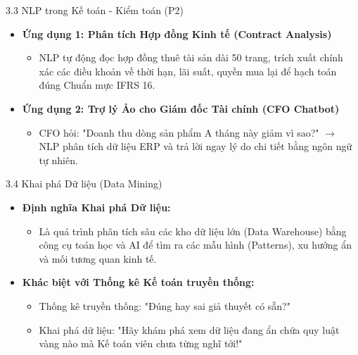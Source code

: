 \documentclass[aspectratio=169]{beamer}
\begin{document}
\begin{frame}{3.3 NLP trong Kế toán - Kiểm toán (P2)}
    \begin{itemize}
        \item \textbf{Ứng dụng 1: Phân tích Hợp đồng Kinh tế (Contract Analysis)}
        \begin{itemize}
            \item NLP tự động đọc hợp đồng thuê tài sản dài 50 trang, trích xuất chính xác các điều khoản về thời hạn, lãi suất, quyền mua lại để hạch toán đúng Chuẩn mực IFRS 16.
        \end{itemize}
        \item \textbf{Ứng dụng 2: Trợ lý Ảo cho Giám đốc Tài chính (CFO Chatbot)}
        \begin{itemize}
            \item CFO hỏi: "Doanh thu dòng sản phẩm A tháng này giảm vì sao?" $\rightarrow$ NLP phân tích dữ liệu ERP và trả lời ngay lý do chi tiết bằng ngôn ngữ tự nhiên.
        \end{itemize}
    \end{itemize}
\end{frame}

\begin{frame}{3.4 Khai phá Dữ liệu (Data Mining)}
    \begin{itemize}
        \item \textbf{Định nghĩa Khai phá Dữ liệu:}
        \begin{itemize}
            \item Là quá trình phân tích sâu các kho dữ liệu lớn (Data Warehouse) bằng công cụ toán học và AI để tìm ra các mẫu hình (Patterns), xu hướng ẩn và mối tương quan kinh tế.
        \end{itemize}
        \item \textbf{Khác biệt với Thống kê Kế toán truyền thống:}
        \begin{itemize}
            \item Thống kê truyền thống: "Đúng hay sai giả thuyết có sẵn?"
            \item Khai phá dữ liệu: "Hãy khám phá xem dữ liệu đang ẩn chứa quy luật vàng nào mà Kế toán viên chưa từng nghĩ tới!"
        \end{itemize}
    \end{itemize}
\end{frame}
\end{document}
